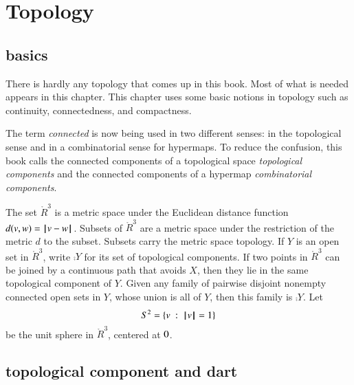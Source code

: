 \section{Topology}\label{sec:topology}

\subsection{basics}

There is hardly any topology that comes up in this book.  Most of
what is needed appears in this chapter.  This chapter uses some basic
notions in topology such as continuity, connectedness, and compactness.

\begin{remark} The term {\it connected} is now being used in
two different senses: in the topological sense and in a combinatorial
sense for hypermaps.    To reduce the confusion, this book calls the connected components
of a topological space {\it topological components} and the connected
components of a hypermap {\it combinatorial components}.
\end{remark}





The set $\ring{R}^3$ is a metric space under the
Euclidean distance function $d(v,w) = {\hskip0.1em|\hskip-0.15em|\hskip0.1em}v - w{\hskip0.1em|\hskip-0.15em|\hskip0.1em}$.  Subsets of
$\ring{R}^3$ are a metric space under the restriction of the metric
$d$ to the subset. Subsets carry the metric space topology.
If $Y$ is an open set in $\ring{R}^3$, write
$\comp{Y}$ for its set of topological components.
If two
points in $\ring{R}^3$ 
can be joined by a continuous path that avoids $X$,
then they lie in the same topological component of $Y$.
Given any  family of pairwise disjoint nonempty connected open sets in
$Y$, whose union is all of $Y$, then
this family is $\comp{Y}$.
Let $$S^2 = \{ v \ :\  {{\hskip0.1em|\hskip-0.15em|\hskip0.1em} v{\hskip0.1em|\hskip-0.15em|\hskip0.1em}} = 1\}$$ be the unit sphere in
$\ring{R}^3$, centered at $0$.  






\subsection{topological component and dart}

